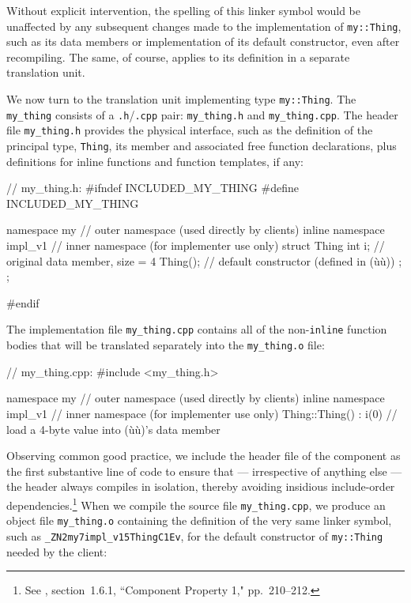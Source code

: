 \noindent Without explicit intervention, the spelling of this linker symbol would
be unaffected by any subsequent changes made to the implementation of
\lstinline!my::Thing!, such as its data members or implementation of its
default constructor, even after recompiling. The same, of course,
applies to its definition in a separate translation unit.

We now turn to the translation unit implementing type
\lstinline!my::Thing!. The \lstinline!my_thing!  consists
of a \lstinline!.h!/\lstinline!.cpp! pair: \lstinline!my_thing.h! and
\lstinline!my_thing.cpp!. The header file \lstinline!my_thing.h! provides
the physical interface, such as the definition of the principal type,
\lstinline!Thing!, its member and associated free function declarations,
plus definitions for inline functions and function templates, if any:

\begin{emcppslisting}[emcppsbatch=e4]
// my_thing.h:
#ifndef INCLUDED_MY_THING
#define INCLUDED_MY_THING

namespace my                  // outer namespace (used directly by clients)
{
    inline namespace impl_v1  // inner namespace (for implementer use only)
    {
        struct Thing
        {
            int i;    // original data member, size = 4
            Thing();  // default constructor (defined in (ù{}ù))
        };
    };
}

#endif
\end{emcppslisting}
    
\noindent The implementation file \lstinline!my_thing.cpp! contains all of the
non-\lstinline!inline! function bodies that will be translated separately
into the \lstinline!my_thing.o! file:

\begin{emcppslisting}[emcppsbatch=e4]
// my_thing.cpp:
#include <my_thing.h>

namespace my                   // outer namespace (used directly by clients)
{
    inline namespace impl_v1   // inner namespace (for implementer use only)
    {
        Thing::Thing() : i(0)  // load a 4-byte value into (ù{}ù)'s data member
        {
        }
    }
}
\end{emcppslisting}
    
\noindent Observing common good practice, we include the header file of the component
as the first substantive line of code to ensure that --- irrespective of
anything else --- the header always compiles in isolation, thereby
avoiding insidious include-order dependencies.{\cprotect\footnote{See
  \cite{lakos20}, section~1.6.1, ``Component Property 1," pp.~210--212.}} When we compile the source file \lstinline!my_thing.cpp!,
we produce an object file \lstinline!my_thing.o! containing the definition
of the very same linker symbol, such as
\lstinline!_ZN2my7impl_v15ThingC1Ev!, for the default constructor of
\lstinline!my::Thing! needed by the client:

